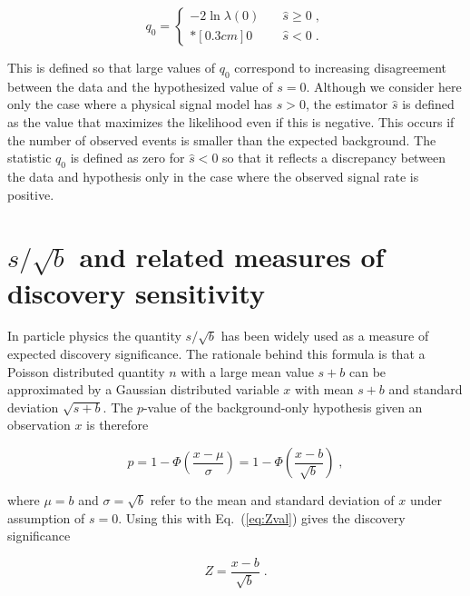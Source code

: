 \documentclass[11pt]{article}
\begin{document}
\begin{equation}
\label{eq:q0} 
q_{0} =  
\left\{ \! \! \begin{array}{ll}
               - 2 \ln \lambda(0)  
               & \quad \hat{s} \ge 0 \;, \\*[0.3 cm]
               0 & \quad \hat{s} < 0  \;.
              \end{array}
       \right.
\end{equation}

\noindent This is defined so that large values of $q_0$ correspond to
increasing disagreement between the data and the hypothesized value of
$s = 0$.  Although we consider here only the case where a physical
signal model has $s > 0$, the estimator $\hat{s}$ is defined as the
value that maximizes the likelihood even if this is negative.  This
occurs if the number of observed events is smaller than the expected
background.  The statistic $q_0$ is defined as zero for $\hat{s} < 0$
so that it reflects a discrepancy between the data and hypothesis only
in the case where the observed signal rate is positive.

\section{$s/\sqrt{b}$ and related measures of discovery sensitivity}
\label{sec:soverrootb}

In particle physics the quantity $s/\sqrt{b}$ has been widely used as
a measure of expected discovery significance.  The rationale behind
this formula is that a Poisson distributed quantity $n$ with a large
mean value $s+b$ can be approximated by a Gaussian distributed
variable $x$ with mean $s+b$ and standard deviation $\sqrt{s+b}$.  The
$p$-value of the background-only hypothesis given an observation $x$
is therefore

\begin{equation}
\label{eq:pvalx}
p = 1 - \Phi \left( \frac{x - \mu}{\sigma} \right) = 
1 - \Phi \left( \frac{ x - b }{\sqrt{b}} \right) \;,
\end{equation}

\noindent where $\mu = b$ and $\sigma = \sqrt{b}$ refer to the mean
and standard deviation of $x$ under assumption of $s=0$.  Using this
with Eq.~(\ref{eq:Zval}) gives the discovery significance

\begin{equation}
\label{eq:Zx}
Z = \frac{x -b}{\sqrt{b}} \;.
\end{equation}
\end{document}
